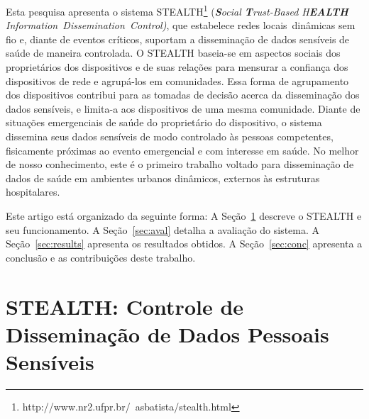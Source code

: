 \documentclass[12pt]{article}
\begin{document}
Esta pesquisa apresenta o sistema \mbox{STEALTH}\footnote{http://www.nr2.ufpr.br/~asbatista/stealth.html} (\textit{\textbf{S}ocial \textbf{T}rust-Based H\textbf{EALTH} \mbox{Information Dissemination Control)}}, que estabelece redes locais~dinâmicas sem fio e, diante de eventos críticos, suportam a disseminação de dados sensíveis de saúde de maneira controlada. O \mbox{STEALTH} baseia-se em aspectos sociais dos proprietários dos dispositivos e de suas relações para mensurar a confiança dos dispositivos de rede e agrupá-los em comunidades. Essa forma de agrupamento dos dispositivos contribui para as tomadas de decisão acerca da disseminação dos dados sensíveis, e limita-a aos dispositivos de uma mesma comunidade. Diante de situações emergenciais de saúde do proprietário do dispositivo, o sistema dissemina seus dados sensíveis de modo controlado às pessoas competentes, fisicamente próximas ao evento emergencial e com interesse em saúde. No melhor de nosso conhecimento, este é o primeiro trabalho voltado para disseminação de dados de saúde em ambientes urbanos dinâmicos, externos às estruturas hospitalares. 

Este artigo está organizado da seguinte forma: A Seção~\ref{sec:sistema} descreve o \mbox{STEALTH} e seu funcionamento. A Seção~\ref{sec:aval} detalha a avaliação do sistema. A Seção~\ref{sec:results} apresenta os resultados obtidos. A Seção~\ref{sec:conc} apresenta a conclusão e as contribuições deste trabalho.

\vspace{-0.2cm}

\section{STEALTH: Controle de Disseminação de Dados Pessoais Sensíveis} \label{sec:sistema}
\end{document}
